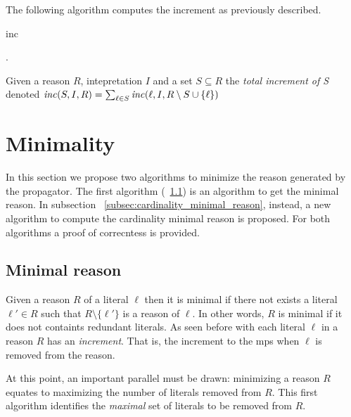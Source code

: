 The following algorithm computes the increment as previously described.
\begin{algorithm}[h]\small
    \caption{inc}
        \label{alg:increment}
        .
\end{algorithm}

Given a reason $R$, intepretation $I$ and a set $S \subseteq R$
the \textit{total increment of S} denoted $\mathit{inc}(S,I,R) = \sum_{\ell \in S} \mathit{inc}(\ell, I, R \setminus S \cup \{\ell\})$ 

\section{Minimality}
\label{sec:minimality}
In this section we  propose two algorithms to minimize the reason 
generated by the propagator. The first algorithm  (~\ref{subsec:minimal_reason}) is an algorithm
to get the minimal reason.
In subsection ~\ref{subsec:cardinality_minimal_reason}, instead,
a new algorithm to compute the cardinality minimal reason is proposed.
For both algorithms a proof of correcntess is provided.

\subsection{Minimal reason}
\label{subsec:minimal_reason}

Given a reason $R$ of a literal $\ell$ then it is minimal if there  not exists 
a literal $\ell' \in R$ such that $R \setminus \{\ell'\}$ is a reason of 
$\ell$. In other words, $R$ is minimal if it does not containts redundant literals.
As seen before with each literal $\ell$ in a reason $R$ has an \textit{increment}.
That is, the increment to the mps when  $\ell$ is removed from the reason.

At this point, an important parallel must be drawn: 
minimizing a reason \(R\) equates to maximizing the
number of literals removed from \(R\). 
This first algorithm identifies the \textit{maximal} 
set of literals to be removed from \(R\).

